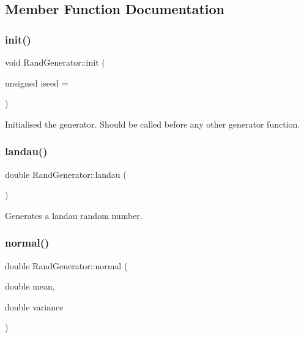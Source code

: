 \subsection{Member Function Documentation}
\mbox{\label{classRandGenerator_a9267feee8104be313e92a678c9f75bb2}} 
\subsubsection{\texorpdfstring{init()}{init()}}
{\footnotesize\ttfamily void Rand\+Generator\+::init (\begin{DoxyParamCaption}\item[{unsigned}]{iseed = {} }\end{DoxyParamCaption})}

Initialised the generator. Should be called before any other generator function. \mbox{\label{classRandGenerator_a3469bd4f50eafa47d6b60441f4b3207b}} 
\subsubsection{\texorpdfstring{landau()}{landau()}}
{\footnotesize\ttfamily double Rand\+Generator\+::landau (\begin{DoxyParamCaption}{ }\end{DoxyParamCaption})}

Generates a landau random number. \mbox{\label{classRandGenerator_a581d2a0a543b4df67361487a2c05125d}} 
\subsubsection{\texorpdfstring{normal()}{normal()}\hspace{0.1cm}{\footnotesize\ttfamily [1/2]}}
{\footnotesize\ttfamily double Rand\+Generator\+::normal (\begin{DoxyParamCaption}\item[{double}]{mean,  }\item[{double}]{variance }\end{DoxyParamCaption})}

